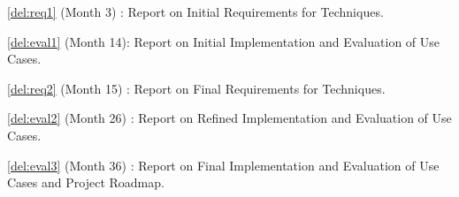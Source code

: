 \begin{Workpackage}{\thewpno}
%  

\begin{WPDeliverables}
  \begin{compactitem}
\item \ref{del:req1} (Month 3) : Report on Initial Requirements for \TheProject{} Techniques.
\item \ref{del:eval1} (Month 14): Report on Initial Implementation and Evaluation of Use Cases.
\item \ref{del:req2} (Month 15) : Report on Final Requirements for \TheProject{} Techniques.
\item \ref{del:eval2} (Month 26) : Report on Refined Implementation and Evaluation of Use Cases.
\item \ref{del:eval3} (Month 36) : Report on Final Implementation and Evaluation of Use Cases and Project Roadmap.
\end{compactitem}
\end{WPDeliverables}
\end{Workpackage}
